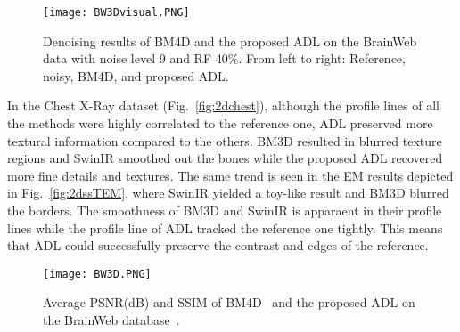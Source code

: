\documentclass[journal,twoside,web]{ieeecolor}
\begin{document}
\begin{figure*}\centering
        \centering
        \texttt{[image: BW3Dvisual.PNG]}
        \label{fig:visualmri}
\caption{Denoising results of BM4D and the proposed ADL on the BrainWeb data with noise level 9 and RF 40\%. From left to right: Reference, noisy, BM4D, and proposed ADL.}
\label{fig:visualcomp3d}
\end{figure*}In the Chest X-Ray dataset (Fig.~\ref{fig:2dchest}), although the profile lines of all the methods were highly correlated to the reference one, ADL preserved more textural information compared to the others. BM3D resulted in blurred texture regions and SwinIR smoothed out the bones while the proposed ADL recovered more fine details and textures.
The same trend is seen in the EM results depicted in Fig.~\ref{fig:2dssTEM}, where SwinIR yielded a toy-like result and BM3D blurred the borders. The smoothness of BM3D and SwinIR is apparaent in their profile lines while the profile line of ADL tracked the reference one tightly. This means that ADL could successfully preserve the contrast and edges of the reference. 




\begin{figure}\centering
    \texttt{[image: BW3D.PNG]}
\caption{Average PSNR(dB) and SSIM of BM4D~\cite{maggioni2012nonlocal} and the proposed ADL on the BrainWeb database~\cite{cocosco1997brainweb}.}
\label{fig:mri3d}
\end{figure} 
\end{document}
